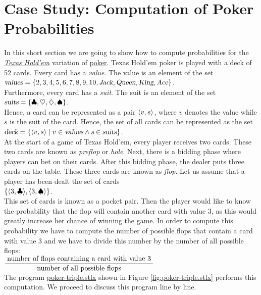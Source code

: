 \section{Case Study: Computation of Poker Probabilities}
In this short section we are going to show how to compute probabilities for the
\href{https://en.wikipedia.org/wiki/Texas_hold_%27em}{\textsl{Texas Hold'em}} variation of 
\href{https://en.wikipedia.org/wiki/Poker}{poker}.   Texas Hold'em poker is played with a deck of 52
cards.  Every card has a \emph{value}.  The value is an element of the set
\\[0.2cm]
\hspace*{1.3cm} 
$\textsl{values} = \{ 2, 3, 4, 5, 6, 7, 8, 9, 10, \textsl{Jack}, \textsl{Queen}, \textsl{King}, \textsl{Ace} \}$.
\\[0.2cm]
Furthermore, every card has a \emph{suit}.  The suit is an element of the set
\\[0.2cm]
\hspace*{1.3cm} 
$\textsl{suits} = \{ \clubsuit , \heartsuit , \diamondsuit, \spadesuit  \}$.
\\[0.2cm]
Hence, a card can be represented as a pair $\pair(v,s)$, where $v$ denotes the value while $s$ is
the suit of the card.  Hence, the set of all cards can be represented as the set
\\[0.2cm]
\hspace*{1.3cm} 
$\textsl{deck} = \{ \pair(v,s) \mid v \in \textsl{values} \wedge \textsl{s} \in \textsl{suits} \}$.
\\[0.2cm]
At the start of a game of Texas Hold'em, every player receives two cards.  These two cards are known
as \emph{preflop} or \emph{hole}.  Next, there is a bidding phase where players can bet on their
cards.   After this bidding phase, the dealer puts three cards on the table.  These three cards are
known as \emph{flop}.  Let us assume that a player has been dealt the set of cards
\\[0.2cm]
\hspace*{1.3cm}
$\{ \pair(3, \club), \pair(3, \spade) \}$.
\\[0.2cm]
This set of cards is known as a pocket pair.  Then the player would like to know the probability
that the flop will contain another card with value $3$, as this would greatly increase her chance of
winning the game.  In order to compute this probability we have to compute the number of possible
flops that contain a card with value $3$ and we have to divide this number by the number of all
possible flops:
\\[0.2cm]
\hspace*{1.3cm}
$\displaystyle \frac{\;\mbox{number of flops containing a card with value $3$}\;}{\mbox{number of all possible flops}}$
\\[0.2cm]
The program
\href{https://github.com/karlstroetmann/Logik/blob/master/SetlX/poker-triple.stlx}{poker-triple.stlx}
shown in Figure \ref{fig:poker-triple.stlx} performs this computation.  We proceed to discuss this
program line by line.


